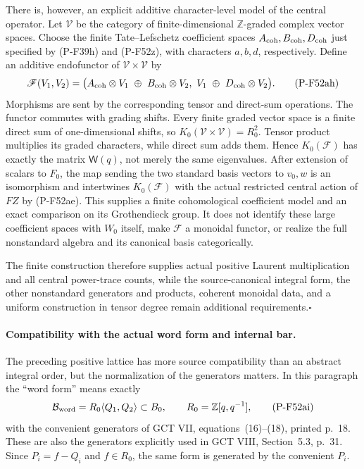 \documentclass[11pt,a4paper]{article}
\begin{document}
There is, however, an explicit additive character-level model
of the central operator. Let $\mathscr V$ be the category of
finite-dimensional $\mathbb Z$-graded complex vector spaces.
Choose the finite Tate--Lefschetz coefficient spaces
$A_{\rm coh},B_{\rm coh},D_{\rm coh}$ just specified by
(P-F39h) and (P-F52z), with characters $a,b,d$, respectively.
Define an additive endofunctor of $\mathscr V\times\mathscr V$ by
\[
 \mathscr F(V_1,V_2)=
 \bigl(A_{\rm coh}\otimes V_1\ \oplus\ B_{\rm coh}\otimes V_2,
                    \ V_1\ \oplus\ D_{\rm coh}\otimes V_2\bigr).
                                                               \tag{P-F52ah}
\]
Morphisms are sent by the corresponding tensor and direct-sum
operations. The functor commutes with grading shifts.
Every finite graded vector space is a finite direct sum of
one-dimensional shifts, so
$K_0(\mathscr V\times\mathscr V)=R_0^2$.
Tensor product multiplies its graded characters, while
direct sum adds them. Hence $K_0(\mathscr F)$ has exactly
the matrix $\mathsf W(q)$, not merely the same eigenvalues.
After extension of scalars to $F_0$, the map sending the
two standard basis vectors to $v_0,w$ is an isomorphism
and intertwines $K_0(\mathscr F)$ with the actual restricted
central action of $FZ$ by (P-F52ae).
This supplies a finite cohomological coefficient model and an
exact comparison on its Grothendieck group. It does not
identify these large coefficient spaces with $W_0$ itself,
make $\mathscr F$ a monoidal functor, or realize the full
nonstandard algebra and its canonical basis categorically.

The finite construction therefore supplies actual positive
Laurent multiplication and all central power-trace counts,
while the source-canonical integral form, the other
nonstandard generators and products, coherent monoidal
data, and a uniform construction in tensor degree remain
additional requirements.\hfill$\square$

\paragraph{Compatibility with the actual word form and internal bar.}
The preceding positive lattice has more source compatibility than
an abstract integral order, but the normalization of the generators
matters. In this paragraph the ``word form'' means exactly
\[
       \mathcal B_{\rm word}
           =R_0\langle Q_1,Q_2\rangle\subset B_0,
           \qquad R_0=\mathbb Z[q,q^{-1}],
                                                               \tag{P-F52ai}
\]
with the convenient generators of GCT VII, equations~(16)--(18),
printed p.~18. These are also the generators explicitly used in
GCT VIII, Section~5.3, p.~31. Since $P_i=f-Q_i$ and $f\in R_0$,
the same form is generated by the convenient $P_i$.
\end{document}
